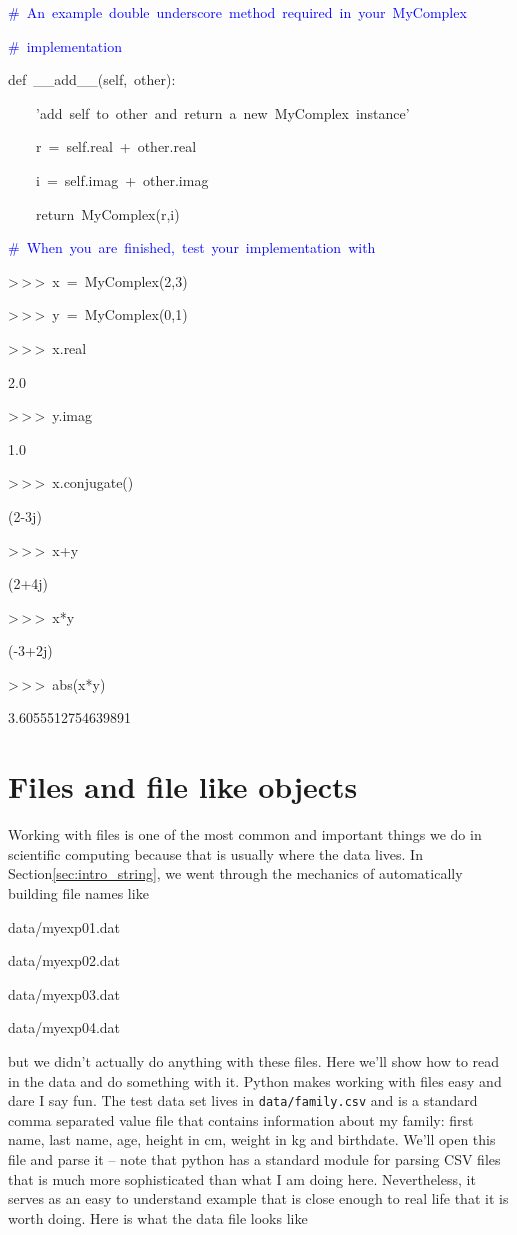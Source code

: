 \begin{lyxcode}
\textcolor{blue}{\#~An~example~double~underscore~method~required~in~your~MyComplex}

\textcolor{blue}{\#~implementation}

def~\_\_add\_\_(self,~other):

~~~~'add~self~to~other~and~return~a~new~MyComplex~instance'

~~~~r~=~self.real~+~other.real

~~~~i~=~self.imag~+~other.imag

~~~~return~MyComplex(r,i)



\textcolor{blue}{\#~When~you~are~finished,~test~your~implementation~with~}

>\,{}>\,{}>~x~=~MyComplex(2,3)

>\,{}>\,{}>~y~=~MyComplex(0,1)

>\,{}>\,{}>~x.real

2.0

>\,{}>\,{}>~y.imag

1.0

>\,{}>\,{}>~x.conjugate()

(2-3j)

>\,{}>\,{}>~x+y

(2+4j)

>\,{}>\,{}>~x{*}y

(-3+2j)

>\,{}>\,{}>~abs(x{*}y)

3.6055512754639891


\end{lyxcode}

\section[Files]{Files and file like objects}

Working with files is one of the most common and important things
we do in scientific computing because that is usually where the data
lives. In Section\ref{sec:intro_string}, we went through the mechanics
of automatically building file names like

\begin{lyxcode}
data/myexp01.dat

data/myexp02.dat

data/myexp03.dat

data/myexp04.dat
\end{lyxcode}
but we didn't actually do anything with these files. Here we'll show
how to read in the data and do something with it. Python makes working
with files easy and dare I say fun. The test data set lives in \texttt{data/family.csv}
and is a standard comma separated value file that contains information
about my family: first name, last name, age, height in cm, weight
in kg and birthdate. We'll open this file and parse it -- note that
python has a standard module for parsing CSV files that is much more
sophisticated than what I am doing here. Nevertheless, it serves as
an easy to understand example that is close enough to real life that
it is worth doing. Here is what the data file looks like

